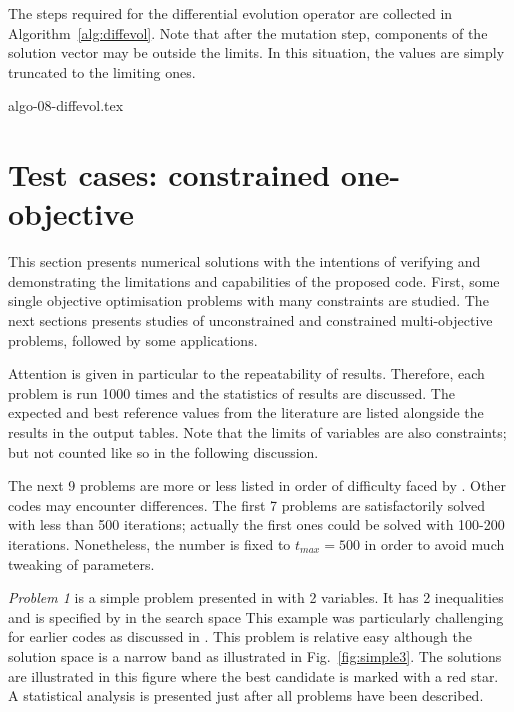 \documentclass[final,5p,times,twocolumn]{elsarticle}
\newcommand{\figname} {Fig.}
\begin{document}
The steps required for the differential evolution operator are collected in Algorithm~\ref{alg:diffevol}.
Note that after the mutation step, components of the solution vector may be outside the limits. In
this situation, the values are simply truncated to the limiting ones.


{algo-08-diffevol.tex}



\section{Test cases: constrained one-objective}

This section presents numerical solutions with the intentions of verifying and demonstrating the
limitations and capabilities of the proposed code. First, some single objective optimisation
problems with many constraints are studied. The next sections presents studies of unconstrained and
constrained multi-objective problems, followed by some applications.

Attention is given in particular to the repeatability of results. Therefore, each problem is run
1000 times and the statistics of results are discussed. The expected and best reference values from
the literature are listed alongside the results in the output tables. Note that the limits of
variables are also constraints; but not counted like so in the following discussion.

The next 9 problems are more or less listed in order of difficulty faced by \goga. Other codes may
encounter differences. The first 7 problems are satisfactorily solved with less than 500 iterations;
actually the first ones could be solved with 100-200 iterations. Nonetheless, the number is fixed to
$t_{max}=500$ in order to avoid much tweaking of parameters.


\emph{Problem 1} is a simple problem presented in \citep{deb:00} with 2 variables. It has
2 inequalities and is specified by
\OptmProbOne
in the search space 
\OptmProbOneX
This example was particularly challenging for earlier codes as discussed in \citep{deb:00}. This
problem is relative easy although the solution space is a narrow band as illustrated in
\figname~\ref{fig:simple3}. The solutions are illustrated in this figure where the best candidate is
marked with a red star. A statistical analysis is presented just after all problems have been
described.
\end{document}
